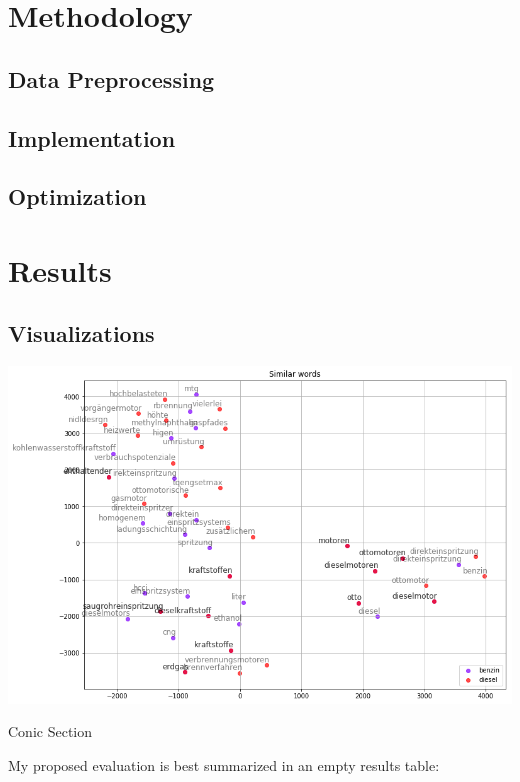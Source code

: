 \documentclass[10pt,a4paper]{article}
\begin{document}
	\section{Methodology}
	\subsection{Data Preprocessing}
	\subsection{Implementation}
	\subsection{Optimization}
	\section{Results}
	\subsection{Visualizations}
	    \begin{center}
		\includegraphics[scale=0.5]{./Pictures/test.png}
		\caption{Conic Section}
	\end{center}
	
	My proposed evaluation is best summarized in an empty results table:
	
\end{document}
